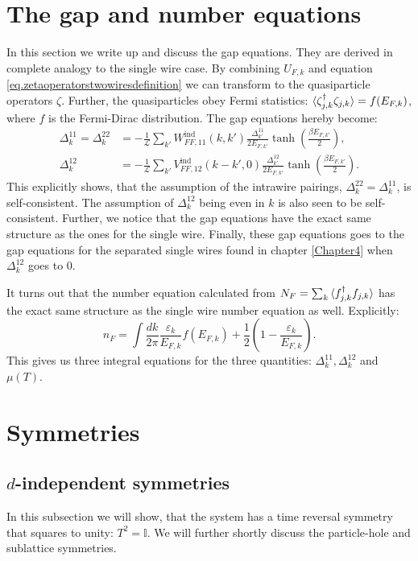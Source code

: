 \section{The gap and number equations}
\label{sec.2wiresgapandnumberequations}
In this section we write up and discuss the gap equations. They are derived in complete analogy to the single wire case. By combining $U_{F,k}$ and equation \ref{eq.zetaoperatorstwowiresdefinition} we can transform to the quasiparticle operators $\zeta$. Further, the quasiparticles obey Fermi statistics: $\braket{\zeta^\dagger_{j,k}\zeta_{j, k}} = f(E_{F,k})$, where $f$ is the Fermi-Dirac distribution. The gap equations hereby become:
\begin{align}
\Delta^{11}_k = \Delta^{22}_k &= -\frac{1}{\mathcal{L}}\sum_{k'} W^\text{ind}_{FF,11}(k,k')\frac{\Delta^{11}_{k'}}{2E_{F,k'}}\tanh\left(\frac{\beta E_{F,k'}}{2}\right), \nonumber \\
\Delta^{12}_k &= -\frac{1}{\mathcal{L}}\sum_{k'} V^\text{ind}_{FF,12}(k - k',0)\frac{\Delta^{12}_{k'}}{2E_{F,k'}}\tanh\left(\frac{\beta E_{F,k'}}{2}\right).
\label{eq.2wiresgapequations}
\end{align}
This explicitly shows, that the assumption of the intrawire pairings, $\Delta^{22}_k = \Delta^{11}_k$, is self-consistent. The assumption of $\Delta^{12}_k$ being even in $k$ is also seen to be self-consistent. Further, we notice that the gap equations have the exact same structure as the ones for the single wire. Finally, these gap equations goes to the gap equations for the separated single wires found in chapter \ref{Chapter4} when $\Delta^{12}_k$ goes to $0$.  

It turns out that the number equation calculated from $N_F = \sum_k \braket{f^\dagger_{j,k}f_{j,k}}$ has the exact same structure as the single wire number equation as well. Explicitly: 
\begin{equation}
n_F = \int \frac{dk}{2\pi} \frac{\varepsilon_k}{E_{F,k}}f(E_{F,k}) + \frac{1}{2}\left(1 - \frac{\varepsilon_k}{E_{F,k}}\right). 
\label{eq.numberequationtwowires}
\end{equation}
This gives us three integral equations for the three quantities: $\Delta^{11}_k, \Delta^{12}_k$ and $\mu(T)$.

\section{Symmetries}
\label{sec.2wiressymmetries}

\subsection{$d$-independent symmetries}
In this subsection we will show, that the system has a time reversal symmetry that squares to unity: $T^2 = \mathbb{I}$. We will further shortly discuss the particle-hole and sublattice symmetries. 

